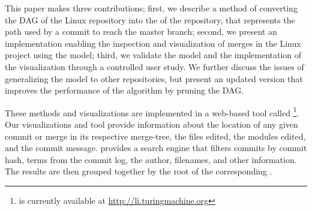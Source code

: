This paper makes three contributions; first, we describe a method of
converting the DAG of the Linux repository into the \mt of the
repository, that represents the path used by a commit to reach the
master branch; second, we present an implementation enabling the
inspection and visualization of merges in the Linux project using the
\mt model; third, we validate the \mt model and the implementation of
the visualization through a controlled user study. We further discuss the
issues of generalizing the model to other repositories, but present an
updated version that improves the performance of the algorithm by
pruning the DAG.\@

These methods and visualizations are implemented in a web-based tool
called \tool\footnote{\tool is currently available at
  \url{http://li.turingmachine.org}}. Our visualizations and tool
provide information about the location of any given commit or merge in
its respective merge-tree, the files edited, the modules edited, and the
commit message. \tool provides a search engine that filters commits by
commit hash, terms from the commit log, the author, filenames, and other
information. The results are then grouped together by the root of the
corresponding \mt.
